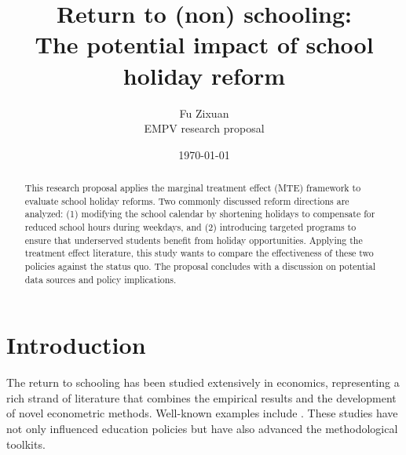 \documentclass[12pt]{article}
\title{Return to (non) schooling:\\{\large {The potential impact of school holiday reform}}}
\author{Fu Zixuan \\{\small {EMPV research proposal}}}
\date{\today}
\begin{document}
\maketitle
\thispagestyle{empty}
\begin{abstract}
    \noindent  This research proposal applies the marginal treatment effect (MTE) framework to evaluate school holiday reforms. Two commonly discussed reform directions are analyzed: (1) modifying the school calendar by shortening holidays to compensate for reduced school hours during weekdays, and (2) introducing targeted programs to ensure that underserved students benefit from holiday opportunities. Applying the treatment effect literature, this study wants to compare the effectiveness of these two policies against the status quo. The proposal concludes with a discussion on potential data sources and policy implications.
    \bigskip
\end{abstract}

\newpage
\thispagestyle{empty}
\tableofcontents
\newpage

\setcounter{page}{1}

\section{Introduction}

The return to schooling has been studied extensively in economics, representing
a rich strand of literature that combines the empirical results and the
development of novel econometric methods. Well-known examples include
\citet{angrist1991does,imbens1994identification,card2001estimating}. These
studies have not only influenced education policies but have also advanced the
methodological toolkits.
\end{document}
